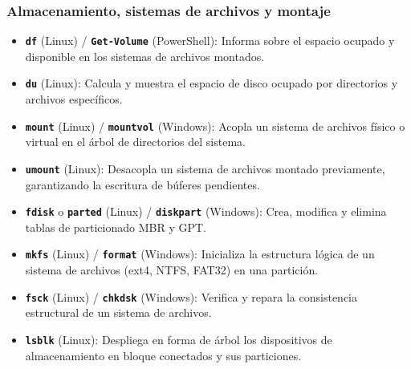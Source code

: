 \documentclass[12pt]{article}
\begin{document}
\subsubsection{Almacenamiento, sistemas de archivos y montaje}
\begin{itemize}[leftmargin=*, noitemsep, topsep=2pt]
    \item \textbf{\texttt{df}} (Linux) / \textbf{\texttt{Get-Volume}} (PowerShell): Informa sobre el espacio ocupado y disponible en los sistemas de archivos montados.
    \item \textbf{\texttt{du}} (Linux): Calcula y muestra el espacio de disco ocupado por directorios y archivos específicos.
    \item \textbf{\texttt{mount}} (Linux) / \textbf{\texttt{mountvol}} (Windows): Acopla un sistema de archivos físico o virtual en el árbol de directorios del sistema.
    \item \textbf{\texttt{umount}} (Linux): Desacopla un sistema de archivos montado previamente, garantizando la escritura de búferes pendientes.
    \item \textbf{\texttt{fdisk}} o \textbf{\texttt{parted}} (Linux) / \textbf{\texttt{diskpart}} (Windows): Crea, modifica y elimina tablas de particionado MBR y GPT.
    \item \textbf{\texttt{mkfs}} (Linux) / \textbf{\texttt{format}} (Windows): Inicializa la estructura lógica de un sistema de archivos (ext4, NTFS, FAT32) en una partición.
    \item \textbf{\texttt{fsck}} (Linux) / \textbf{\texttt{chkdsk}} (Windows): Verifica y repara la consistencia estructural de un sistema de archivos.
    \item \textbf{\texttt{lsblk}} (Linux): Despliega en forma de árbol los dispositivos de almacenamiento en bloque conectados y sus particiones.
\end{itemize}
\end{document}
